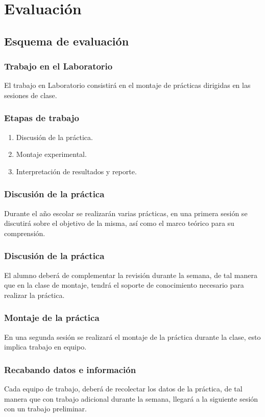 \documentclass[14pt]{beamer}
\begin{document}
\section{Evaluación}
\subsection{Esquema de evaluación}

\begin{frame}
\frametitle{Trabajo en el Laboratorio}
El trabajo en Laboratorio consistirá en el montaje de prácticas dirigidas en las sesiones de clase.
\end{frame}
\begin{frame}
\frametitle{Etapas de trabajo}
\begin{enumerate}[<+->]
\item Discusión de la práctica.
\item Montaje experimental.
\item Interpretación de resultados y reporte.
\end{enumerate}
\end{frame}
\begin{frame}
\frametitle{Discusión de la práctica}
Durante el año escolar se realizarán varias prácticas, en una primera sesión se discutirá sobre el objetivo de la misma, así como el marco teórico para su comprensión.
\end{frame}
\begin{frame}
\frametitle{Discusión de la práctica}
El alumno deberá de complementar la revisión durante la semana, de tal manera que en la clase de montaje, tendrá el soporte de conocimiento necesario para realizar la práctica.
\end{frame}
\begin{frame}
\frametitle{Montaje de la práctica}
En una segunda sesión se realizará el montaje de la práctica durante la clase, esto implica trabajo en equipo.
\end{frame}
\begin{frame}
\frametitle{Recabando datos e información}
Cada equipo de trabajo, deberá de recolectar los datos de la práctica, de tal manera que con trabajo adicional durante la semana, llegará a la siguiente sesión con un trabajo preliminar.
\end{frame}
\end{document}
